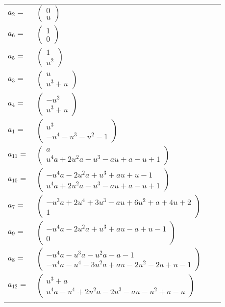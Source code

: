 \documentclass[1p]{elsarticle_modified}
\theoremstyle{definition}
\begin{document}
\begin{tabular}{m{7pt} m{180pt} m{7pt} m{180pt} }
\flushright $a_{2}=$&$\begin{pmatrix}0\\u\end{pmatrix}$ \\
\flushright $a_{6}=$&$\begin{pmatrix}1\\0\end{pmatrix}$ \\
\flushright $a_{5}=$&$\begin{pmatrix}1\\u^2\end{pmatrix}$ \\
\flushright $a_{3}=$&$\begin{pmatrix}u\\u^3+u\end{pmatrix}$ \\
\flushright $a_{4}=$&$\begin{pmatrix}- u^3\\u^3+u\end{pmatrix}$ \\
\flushright $a_{1}=$&$\begin{pmatrix}u^3\\- u^4- u^3- u^2-1\end{pmatrix}$ \\
\flushright $a_{11}=$&$\begin{pmatrix}a\\u^4 a+2 u^2 a- u^3- a u+a- u+1\end{pmatrix}$ \\
\flushright $a_{10}=$&$\begin{pmatrix}- u^4 a-2 u^2 a+u^3+a u+u-1\\u^4 a+2 u^2 a- u^3- a u+a- u+1\end{pmatrix}$ \\
\flushright $a_{7}=$&$\begin{pmatrix}- u^3 a+2 u^4+3 u^3- a u+6 u^2+a+4 u+2\\1\end{pmatrix}$ \\
\flushright $a_{9}=$&$\begin{pmatrix}- u^4 a-2 u^2 a+u^3+a u- a+u-1\\0\end{pmatrix}$ \\
\flushright $a_{8}=$&$\begin{pmatrix}- u^4 a- u^3 a- u^2 a- a-1\\- u^4 a- u^4-3 u^2 a+a u-2 u^2-2 a+u-1\end{pmatrix}$ \\
\flushright $a_{12}=$&$\begin{pmatrix}u^3+a\\u^4 a- u^4+2 u^2 a-2 u^3- a u- u^2+a- u\end{pmatrix}$\\&\end{tabular}
\end{document}
